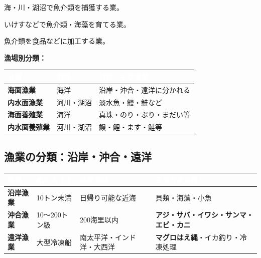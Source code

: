 \documentclass[a4paper,11pt]{article}
\newcommand{\imp}[1]{\textbf{\textcolor{mainred}{#1}}}
\newcommand{\key}[1]{\textbf{\textcolor{mainblue}{#1}}}
\begin{document}
\begin{tcolorbox}[sectionbox, title={■ 水産業の構成}]
\begin{description}[leftmargin=3.5cm, style=nextline]
  \item[\key{漁業}] 海・川・湖沼で魚介類を捕獲する業。
  \item[\key{養殖業}] いけすなどで魚介類・海藻を育てる業。
  \item[\key{水産加工業}] 魚介類を食品などに加工する業。
\end{description}

\medskip
\textbf{漁場別分類：}
\begin{center}
\begin{tabular}{C{2cm}C{4cm}C{7cm}}
\toprule
{}\textcolor{white}{\textbf{分類}} & \textcolor{white}{\textbf{海域}} & \textcolor{white}{\textbf{特徴・主な漁業}} \\
\midrule
\key{海面漁業} & 海洋 & 沿岸・沖合・遠洋に分かれる \\
\key{内水面漁業} & 河川・湖沼 & 淡水魚・鰻・鮭など \\
\key{海面養殖業} & 海洋 & 真珠・のり・ぶり・まだい等 \\
\key{内水面養殖業} & 河川・湖沼 & 鰻・鯉・ます・鮭等 \\
\bottomrule
\end{tabular}
\end{center}
\end{tcolorbox}

\vspace{2mm}

\subsection{漁業の分類：沿岸・沖合・遠洋}

\begin{center}
\renewcommand{\arraystretch}{1.3}
\begin{tabular}{C{2.2cm}C{2.5cm}C{3.5cm}C{5cm}}
\toprule
{}\textcolor{white}{\textbf{種類}} & \textcolor{white}{\textbf{船の大きさ}} & \textcolor{white}{\textbf{操業海域}} & \textcolor{white}{\textbf{主な対象魚種}} \\
\midrule
\key{沿岸漁業} & 10トン未満 & 日帰り可能な近海 & 貝類・海藻・小魚 \\
\key{沖合漁業} & 10〜200トン級 & 200海里以内 & \imp{アジ・サバ・イワシ・サンマ・エビ・カニ} \\
\key{遠洋漁業} & 大型冷凍船 & 南太平洋・インド洋・大西洋 & \imp{マグロはえ縄}・イカ釣り・冷凍処理 \\
\bottomrule
\end{tabular}
\end{center}
\end{document}
